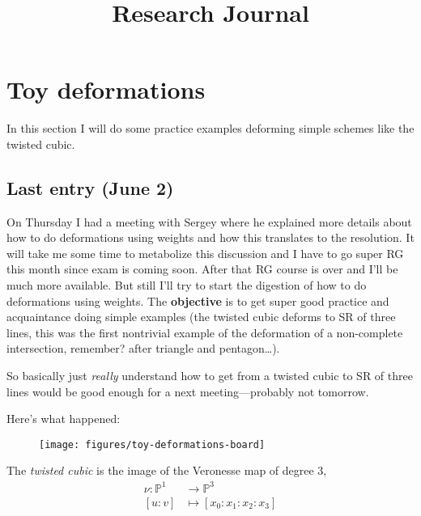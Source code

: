 



\title{Research Journal}
\maketitle

\label{section-phantom}

\tableofcontents


\section{Toy deformations}
\label{section-toy-deformations}

In this section I will do some practice examples deforming simple schemes like
the twisted cubic.



\subsection{Last entry (June 2)}
\label{subsection-june-2}

On Thursday I had a meeting with Sergey where he explained more details about
how to do deformations using weights and how this translates to the resolution.
It will take me some time to metabolize this discussion and I have to go super
RG this month since exam is coming soon. After that RG course is over and I'll
be much more available. But still I'll try to start the digestion of how to do
deformations using weights. The \textbf{objective} is to get super good practice
and acquaintance doing simple examples (the twisted cubic deforms to SR of three
lines, this was the first nontrivial example of the deformation of a
non-complete intersection, remember? after triangle and pentagon…).

So basically just \textit{really} understand how to get from a twisted cubic to
SR of three lines would be good enough for a next meeting---probably not
tomorrow.

Here's what happened:
\begin{figure}[H]
\centering
\texttt{[image: figures/toy-deformations-board]}
\label{figure-toy-deformations-board}
\end{figure}

\begin{definition}
\label{definition-twisted-cubic}
The {\it twisted cubic} is the image of the Veronesse map of degree 3,
\begin{align*}
\nu: \mathbb{P}^1 &\longrightarrow \mathbb{P}^3 \\
[u:v] &\longmapsto [x_0:x_1:x_2:x_3]
\end{align*}
\end{definition}

